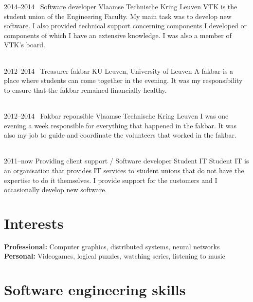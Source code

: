\documentclass[a4paper]{friggeri-cv} %
\begin{document}
\begin{entrylist}
\entry
{2014--2014~}
{Software developer}
{Vlaamse Technische Kring Leuven}
{VTK is the student union of the Engineering Faculty. My main task was to develop new software. I also provided technical support concerning components I developed or components of which I have an extensive knowledge.
I was also a member of VTK’s board.\\
~}


\entry
{2012--2014~}
{Treasurer fakbar}
{KU Leuven, University of Leuven}
{A fakbar is a place where students can come together in the evening. It was my responsibility to ensure that the fakbar remained financially healthy.\\
~}


\entry
{2012--2014~}
{Fakbar reponsible}
{Vlaamse Technische Kring Leuven}
{I was one evening a week responsible for everything that happened in the fakbar. It was also my job to guide and coordinate the volunteers that worked in the fakbar.\\
~}


\entry
{2011--now}
{Providing client support / Software developer}
{Student IT}
{Student IT is an organisation that provides IT services to student unions that do not have the expertise to do it themselves. I provide support for the customers and I occasionally develop new software.}

\end{entrylist}



\section{Interests}

\textbf{Professional:} Computer graphics, distributed systems, neural networks\\
\textbf{Personal:} Videogames, logical puzzles, watching series, listening to music

\newpage
\addtolength{\oddsidemargin}{-1.7cm}
\addtolength{\evensidemargin}{-1.7cm}

\section{Software engineering skills}
~\\
\end{document}
